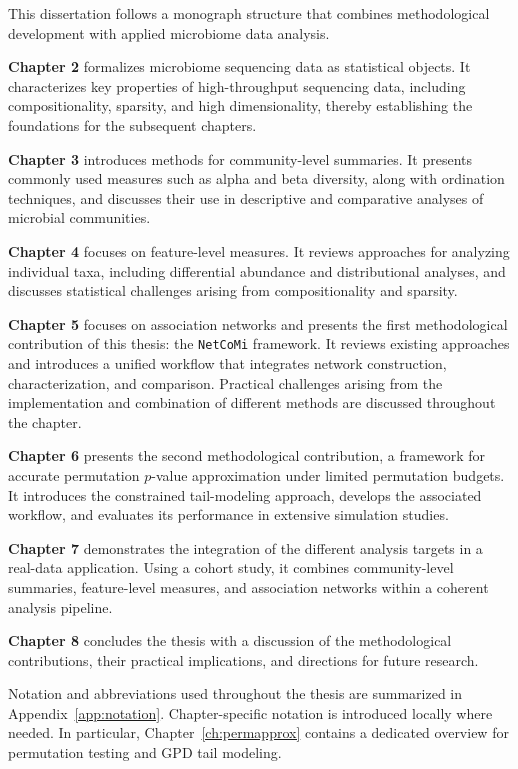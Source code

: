 This dissertation follows a monograph structure that combines methodological development with applied microbiome data analysis.

\textbf{Chapter 2} formalizes microbiome sequencing data as statistical objects. It characterizes key properties of high-throughput sequencing data, including compositionality, sparsity, and high dimensionality, thereby establishing the foundations for the subsequent chapters.

\textbf{Chapter 3} introduces methods for community-level summaries. It presents commonly used measures such as alpha and beta diversity, along with ordination techniques, and discusses their use in descriptive and comparative analyses of microbial communities.

\textbf{Chapter 4} focuses on feature-level measures. It reviews approaches for analyzing individual taxa, including differential abundance and distributional analyses, and discusses statistical challenges arising from compositionality and sparsity.

\textbf{Chapter 5} focuses on association networks and presents the first methodological contribution of this thesis: the \texttt{NetCoMi} framework. 
It reviews existing approaches and introduces a unified workflow that integrates network construction, characterization, and comparison. 
Practical challenges arising from the implementation and combination of different methods are discussed throughout the chapter.

\textbf{Chapter 6} presents the second methodological contribution, a framework for accurate permutation $p$-value approximation under limited permutation budgets. It introduces the constrained tail-modeling approach, develops the associated workflow, and evaluates its performance in extensive simulation studies.

\textbf{Chapter 7} demonstrates the integration of the different analysis targets in a real-data application. Using a cohort study, it combines community-level summaries, feature-level measures, and association networks within a coherent analysis pipeline.

\textbf{Chapter 8} concludes the thesis with a discussion of the methodological contributions, their practical implications, and directions for future research.


Notation and abbreviations used throughout the thesis are summarized in Appendix~\ref{app:notation}. Chapter-specific notation is introduced locally where needed. In particular, Chapter~\ref{ch:permapprox} contains a dedicated overview for permutation testing and GPD tail modeling.
